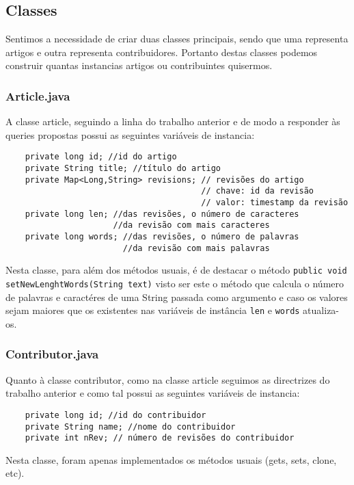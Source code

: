 \documentclass[a4paper,11pt]{article}
\begin{document}
\subsection{Classes}
Sentimos a necessidade de criar duas classes principais, sendo que uma representa artigos e outra representa contribuidores. Portanto destas classes podemos construir quantas instancias artigos ou contribuintes quisermos. 

\subsubsection{Article.java}
A classe article, seguindo a linha do trabalho anterior e de modo a responder às queries propostas possui as seguintes variáveis de instancia:
\begin{verbatim}
    private long id; //id do artigo
    private String title; //título do artigo
    private Map<Long,String> revisions; // revisões do artigo
                                        // chave: id da revisão
                                        // valor: timestamp da revisão
    private long len; //das revisões, o número de caracteres 
                      //da revisão com mais caracteres 
    private long words; //das revisões, o número de palavras 
                        //da revisão com mais palavras
\end{verbatim}
Nesta classe, para além dos métodos usuais, é de destacar o método \texttt{public void setNewLenghtWords(String text)} visto ser este o  método que calcula o número de palavras e caractéres de uma String passada como argumento e caso os valores sejam maiores que os existentes nas variáveis de instância \texttt{len} e \texttt{words} atualiza-os.

\subsubsection{Contributor.java}
Quanto à classe contributor, como na classe article seguimos as directrizes do trabalho anterior e como tal possui as seguintes variáveis de instancia:
\begin{verbatim}
    private long id; //id do contribuidor
    private String name; //nome do contribuidor
    private int nRev; // número de revisões do contribuidor
\end{verbatim}
Nesta classe, foram apenas implementados os métodos usuais (gets, sets, clone, etc).
\end{document}
